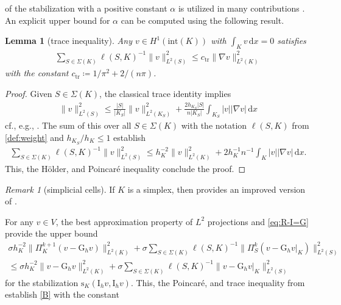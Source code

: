 \documentclass[a4paper]{amsart}
\numberwithin{equation}{section}
\renewcommand{\d}[1]{\,\mathrm{d}#1}
\newcommand{\I}{\mathrm{I}}
\newcommand{\s}{\mathrm{s}}
\newtheorem{lemma}[theorem]{Lemma}
\theoremstyle{remark}
\newtheorem{remark}[theorem]{Remark}
\theoremstyle{definition}
\theoremstyle{assumptionnoperiod}
\begin{document}
\noindent of the stabilization with a positive constant $\alpha$ is utilized in many contributions \cite{ErnZanotti2020,BertrandCarstensenGraessle2021,CarstensenTran2024}.
An explicit upper bound for $\alpha$ can be computed using the following result.
\begin{lemma}[trace inequality]\label{lem:trace-inequality}
	Any $v \in H^1(\mathrm{int}(K))$ with $\int_K v \d{x} = 0$ satisfies
	\begin{align*}
		\sum_{S \in \Sigma(K)} \ell(S,K)^{-1}\|v\|_{L^2(S)}^2 \leq c_{\mathrm{tr}}\|\nabla v\|_{L^2(K)}^2
	\end{align*}
	with the constant $c_\mathrm{tr} \coloneqq 1/\pi^2 + 2/(n\pi)$.
\end{lemma}
\begin{proof}
	Given $S \in \Sigma(K)$, the classical trace identity implies
	\begin{align}\label{ineq:trace-inequality}
		\|v\|^2_{L^2(S)} \leq \frac{|S|}{|K_S|} \|v\|_{L^2(K_S)}^2 + \frac{2h_{K_S}|S|}{n|K_S|} \int_{K_S} |v| |\nabla v| \d{x}
	\end{align}
	cf., e.g., \cite[proof of Lemma 7.2]{Gallistl2023}.
	The sum of this over all $S \in \Sigma(K)$ with the notation $\ell(S,K)$ from \eqref{def:weight} and $h_{K_S}/h_K \leq 1$ establish
	\begin{align*}
		\sum_{S \in \Sigma(K)} \ell(S,K)^{-1}\|v\|_{L^2(S)}^2 \leq h_K^{-2} \|v\|_{L^2(K)}^2 + 2 h_K^{-1} n^{-1} \int_K |v| |\nabla v| \d{x}.
	\end{align*}
	This, the H\"older, and Poincar\'e inequality conclude the proof.
\end{proof}
\begin{remark}[simplicial cells]
	If $K$ is a simplex, then \cite[Proposition 4.3]{CarstensenZhaiZhang2020} provides an improved version of .
\end{remark}
For any $v \in V$,
the best approximation property of $L^2$ projections and \eqref{eq:R-I=G} provide the upper bound
\begin{align}
	\sigma h_K^{-2} \|\Pi_K^{k+1}(v - \mathrm{G}_h v)\|_{L^2(K)}^2 + \sigma \sum_{S \in \Sigma(K)} \ell(S,K)^{-1} \|\Pi_S^k(v - \mathrm{G}_h v|_K)\|_{L^2(S)}^2\nonumber\\
	\leq \sigma h_K^{-2} \|v - \mathrm{G}_h v\|_{L^2(K)}^2 + \sigma \sum_{S \in \Sigma(K)} \ell(S,K)^{-1} \|v - \mathrm{G}_h v|_K\|_{L^2(S)}^2
	\label{ineq:proof-stabilization}
\end{align}
for the stabilization $\s_K(\I_h v, \I_h v)$. This, the Poincar\'e, and trace inequality from  establish \ref{B} with the constant
\end{document}
